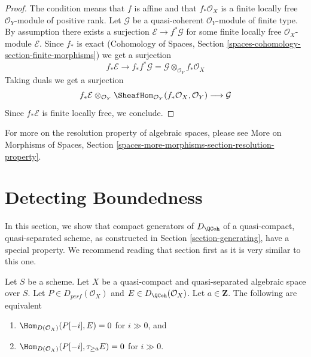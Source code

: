\begin{proof}
The condition means that $f$ is affine and that $f_*\mathcal{O}_X$
is a finite locally free $\mathcal{O}_Y$-module of positive rank.
Let $\mathcal{G}$ be a quasi-coherent $\mathcal{O}_Y$-module
of finite type. By assumption there exists a surjection
$\mathcal{E} \to f^*\mathcal{G}$ for some finite locally free
$\mathcal{O}_X$-module $\mathcal{E}$. Since $f_*$ is exact
(Cohomology of Spaces, Section \ref{spaces-cohomology-section-finite-morphisms})
we get a surjection
$$
f_*\mathcal{E}
\longrightarrow
f_*f^*\mathcal{G} = \mathcal{G} \otimes_{\mathcal{O}_Y} f_*\mathcal{O}_X
$$
Taking duals we get a surjection
$$
f_*\mathcal{E}
\otimes_{\mathcal{O}_Y}
\SheafHom_{\mathcal{O}_Y}(f_*\mathcal{O}_X, \mathcal{O}_Y)
\longrightarrow
\mathcal{G}
$$
Since $f_*\mathcal{E}$ is finite locally free, we conclude.
\end{proof}

\noindent
For more on the resolution property of algebraic spaces, please see
More on Morphisms of Spaces, Section
\ref{spaces-more-morphisms-section-resolution-property}.












\section{Detecting Boundedness}
\label{section-detecting-boundedness}

\noindent
In this section, we show that compact generators of $D_\QCoh$ of a
quasi-compact, quasi-separated scheme, as constructed in
Section \ref{section-generating}, have a special property.
We recommend reading that section first as it is very similar to this one.

\begin{lemma}
\label{lemma-bounded-truncation}
Let $S$ be a scheme.
Let $X$ be a quasi-compact and quasi-separated algebraic space over $S$.
Let $P \in D_{perf}(\mathcal{O}_X)$ and $E \in D_{\QCoh}(\mathcal{O}_X)$.
Let $a \in \mathbf{Z}$. The following are equivalent
\begin{enumerate}
\item $\Hom_{D(\mathcal{O}_X)}(P[-i], E) = 0$ for $i \gg 0$, and
\item $\Hom_{D(\mathcal{O}_X)}(P[-i], \tau_{\geq a} E) = 0$ for $i \gg 0$.
\end{enumerate}
\end{lemma}

